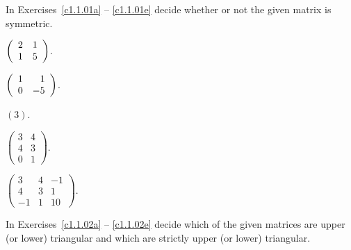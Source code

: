 \documentclass{ximera}
\begin{document}
\noindent In Exercises~\ref{c1.1.01a} -- \ref{c1.1.01e} decide whether or
not the given matrix is symmetric.
\begin{exercise} \label{c1.1.01a}
  $\left(\begin{array}{rr} 2 & 1\\ 1 &5\end{array}\right)$.
  \begin{multipleChoice}
  \end{multipleChoice}
\end{exercise}
\begin{exercise} \label{c1.1.01b}
  $\left(\begin{array}{rr} 1 & 1\\ 0 &-5\end{array}\right)$.
  \begin{multipleChoice}
  \end{multipleChoice}  
\end{exercise}
\begin{exercise} \label{c1.1.01c}
  $(3)$.
  \begin{multipleChoice}
  \end{multipleChoice}  
\end{exercise}
\begin{exercise} \label{c1.1.01d}
  $\left( \begin{array}{rr}
            3 & 4 \\
            4 & 3 \\
            0 & 1 \end{array} \right)$.
  \begin{multipleChoice}
  \end{multipleChoice}          
\end{exercise}
\begin{exercise} \label{c1.1.01e}
 $\left( \begin{array}{rrr}
 3 & 4 & -1\\
 4 & 3 &  1\\
           -1 & 1 & 10\end{array} \right)$.
  \begin{multipleChoice}
  \end{multipleChoice}
       
\end{exercise}

\noindent In Exercises~\ref{c1.1.02a} -- \ref{c1.1.02e} decide which
of the given matrices are upper (or lower) triangular and which are
strictly upper (or lower) triangular.
\end{document}
